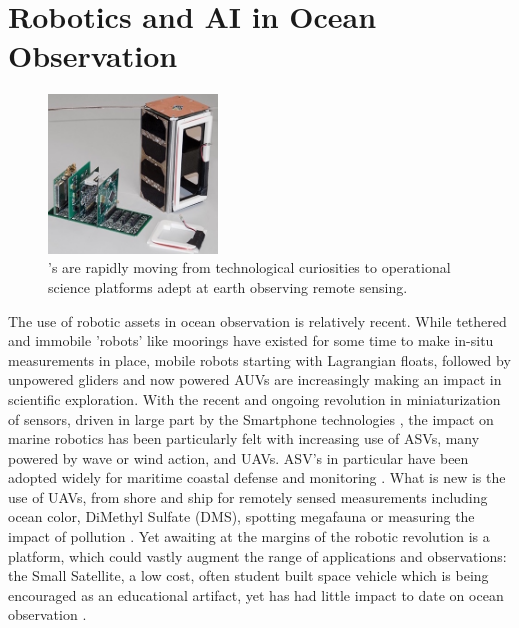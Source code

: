 \section{Robotics and AI in Ocean Observation}

\begin{figure}
  \centering
  \includegraphics[width=0.4\textwidth]{fig/smallsat.png}
  \caption{\smle's are rapidly moving from technological curiosities
    to operational science platforms adept at earth observing remote
    sensing.}
  \label{fig:sats}
\end{figure}

The use of robotic assets in ocean observation is relatively
recent. While tethered and immobile 'robots' like moorings have
existed for some time to make in-situ measurements in place, mobile
robots starting with Lagrangian floats, followed by unpowered gliders
\cite{davis02} and now powered AUVs are increasingly making an impact
in scientific exploration. With the recent and ongoing revolution in
miniaturization of sensors, driven in large part by the Smartphone
technologies \cite{yang18}, the impact on marine robotics has been
particularly felt with increasing use of ASVs, many powered by wave or
wind action, and UAVs. ASV's in particular have been adopted widely
for maritime coastal defense \cite{huntsberger11} and monitoring
\cite{johnston17}. What is new is the use of UAVs, from shore and ship
for remotely sensed measurements including ocean color, DiMethyl
Sulfate (DMS), spotting megafauna or measuring the impact of pollution
\cite{dawson17,Ferreira2018,bayirhan19,wei19,pinto20}. Yet awaiting at
the margins of the robotic revolution is a platform, which could
vastly augment the range of applications and observations: the Small
Satellite, a low cost, often student built space vehicle which is
being encouraged as an educational artifact, yet has had little impact
to date on ocean observation \cite{guerra16}.

